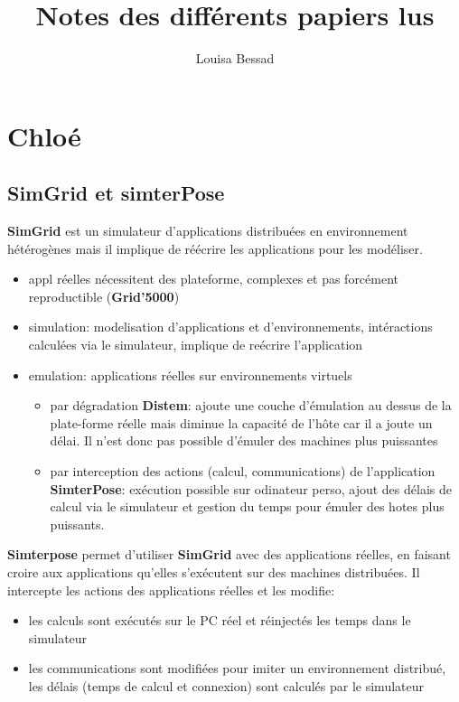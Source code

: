 \documentclass{article}
\title{Notes des différents papiers lus} \author{Louisa Bessad}
\begin{document}
\maketitle 
\tableofcontents

\section{Chloé}
\subsection{SimGrid et simterPose}
\textbf{SimGrid} est un simulateur d'applications distribuées en
environnement hétérogènes mais il implique de réécrire les
applications pour les modéliser.

\begin{itemize}
\item appl réelles nécessitent des plateforme, complexes et pas
  forcément reproductible (\textbf{Grid'5000})
\item simulation: modelisation d'applications et d'environnements,
  intéractions calculées via le simulateur, implique de reécrire
  l'application
\item {\color{red}emulation: applications réelles sur environnements
  virtuels}
\begin{itemize}
\item par dégradation \textbf{Distem}: ajoute une couche d'émulation
  au dessus de la plate-forme réelle mais diminue la capacité de
  l'hôte car il a joute un délai. Il n'est donc pas possible d'émuler
  des machines plus puissantes
\item par interception des actions (calcul, communications) de
  l'application \textbf{SimterPose}: exécution possible sur odinateur
  perso, ajout des délais de calcul via le simulateur et gestion du
  temps pour émuler des hotes plus puissants.
\end{itemize}
\end{itemize}

\textbf{Simterpose} permet d'utiliser \textbf{SimGrid} avec des
applications réelles, en faisant croire aux applications qu'elles
s'exécutent sur des machines distribuées. Il intercepte les actions
des applications réelles et les modifie:
\begin{itemize}
\item les calculs sont exécutés sur le PC réel et réinjectés les temps
  dans le simulateur
\item les communications sont modifiées pour imiter un environnement
  distribué, les délais (temps de calcul et connexion) sont calculés
  par le simulateur
\end{itemize}
\end{document}
